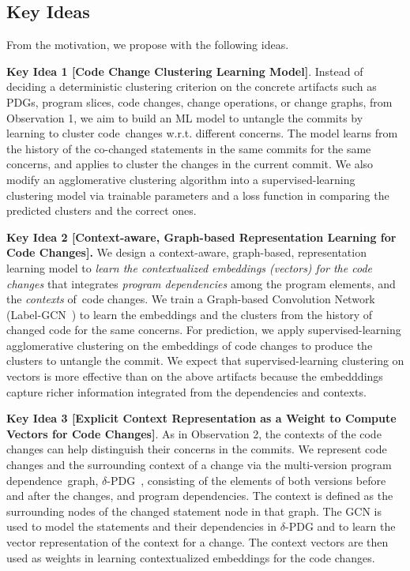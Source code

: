 \subsection{Key Ideas}
\label{ideas:sec}

From the motivation, we propose {\tool} with the following
ideas.


{\bf Key Idea 1 [Code Change Clustering Learning Model]}. Instead of
deciding a deterministic clustering criterion on the concrete
artifacts such as PDGs, program slices, code changes, change
operations, or change graphs, from Observation 1, we aim to build an
ML model to untangle the commits by learning to cluster code~changes
w.r.t. different concerns. The model learns from the history of the
co-changed statements in the same commits for the same concerns, and
applies to cluster the changes in the current commit.  We also modify
an agglomerative clustering algorithm into a supervised-learning
clustering model via trainable parameters and a loss function in
comparing the predicted clusters and the correct ones.

{\bf Key Idea 2 [Context-aware, Graph-based Representation Learning
    for Code Changes].} We design a context-aware, graph-based,
representation learning model to {\em learn the contextualized
  embeddings (vectors) for the code changes} that integrates {\em
  program dependencies} among the program elements, and the {\em
  contexts} of~code changes. We train a Graph-based Convolution
Network (Label-GCN~\cite{yi}) to learn the embeddings and the
clusters from the history of changed code for the same concerns.
For prediction, we apply supervised-learning agglomerative
clustering on the embeddings of code changes to produce the clusters
to untangle the commit. We expect that supervised-learning clustering
on vectors is more effective than on the above artifacts because the
embedddings capture richer information integrated from the
dependencies and contexts.


{\bf Key Idea 3 [Explicit Context Representation as a Weight to
    Compute Vectors for Code Changes]}. As in Observation 2, the
contexts of the code changes can help distinguish their concerns in
the commits. We represent code changes and the surrounding context of
a change via the multi-version program dependence~graph,
$\delta$-PDG~\cite{flexeme-fse20}, consisting of the elements of both
versions before and after the changes, and program dependencies. The
context is defined as the surrounding nodes of the changed statement
node in that graph. The GCN is used to model the statements and their
dependencies in $\delta$-PDG and to learn the vector
representation of the context for a change. The context vectors are
then used as weights in learning contextualized embeddings for the
code changes.

